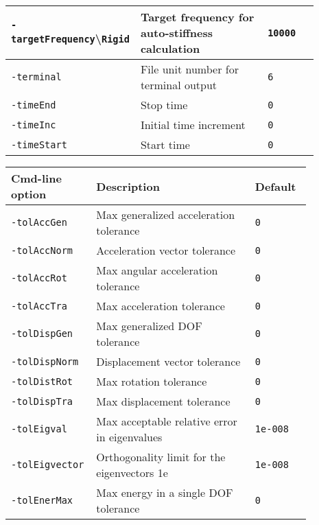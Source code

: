 {\begin{tabular}{|>{\raggedright} p{0.23\linewidth}| p{0.48\linewidth}| p{0.18\linewidth}|}
  \hline
  \texttt{-targetFrequency}\textbackslash\newline\texttt{Rigid}  &     Target frequency for auto-stiffness calculation & \texttt{10000}  \\
  \hline
  \texttt{-terminal}  &     File unit number for terminal output & \texttt{6}  \\
  \hline
  \texttt{-timeEnd}  &     Stop time  & \texttt{0}  \\
  \hline
  \texttt{-timeInc}  &     Initial time increment & \texttt{0}  \\
  \hline
  \texttt{-timeStart}  &     Start time  & \texttt{0}  \\
  \hline
\end{tabular}}

\begin{threeparttable}[b]
\footnotesize
\begin{tabular}{|>{\raggedright} p{0.23\linewidth}| p{0.48\linewidth}| p{0.16\linewidth}|}
  \hline
  \rowcolor[HTML]{EFEFEF}
  \rule{0pt}{15pt}Cmd-line option & Description & Default \\
  \hline\hline
  \texttt{-tolAccGen}  &     Max generalized acceleration tolerance & \texttt{0\tnote{1}}  \\
  \hline
  \texttt{-tolAccNorm}  &     Acceleration vector tolerance & \texttt{0\tnote{1}}  \\
  \hline
  \texttt{-tolAccRot}  &     Max angular acceleration tolerance & \texttt{0\tnote{1}}  \\
  \hline
  \texttt{-tolAccTra}  &     Max acceleration tolerance  & \texttt{0\tnote{1}}  \\
  \hline
  \texttt{-tolDispGen}  &     Max generalized DOF tolerance  & \texttt{0\tnote{1}}  \\
  \hline
  \texttt{-tolDispNorm}  &     Displacement vector tolerance  & \texttt{0\tnote{1}}  \\
  \hline
  \texttt{-tolDistRot}  &     Max rotation tolerance  & \texttt{0\tnote{1}}  \\
  \hline
  \texttt{-tolDispTra}  &     Max displacement tolerance  & \texttt{0\tnote{1}}  \\
  \hline
  \texttt{-tolEigval}  &     Max acceptable relative error in eigenvalues  & \texttt{1e-008}  \\
  \hline
  \texttt{-tolEigvector}  &     Orthogonality limit for the eigenvectors 1e &  \texttt{1e-008}  \\
  \hline
  \texttt{-tolEnerMax}  &     Max energy in a single DOF tolerance   & \texttt{0\tnote{1}}  \\

\end{tabular}
\end{threeparttable}
